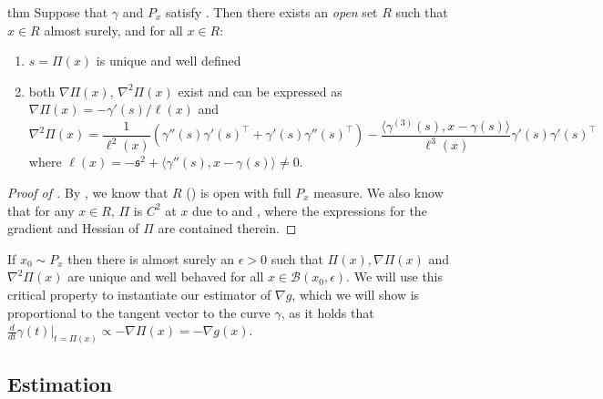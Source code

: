 \documentclass[11pt]{article}
\begin{document}
\begin{restatable}[Differentiability of $\Pi$]{thm}{} \label{thm: differentiability of pi}
    Suppose that $\gamma$ and $P_{x}$ satisfy . Then there exists an \textit{open} set $R$ such that $x \in R$ almost surely, and for all $x \in R$:
    \begin{enumerate}
        \item $s = \Pi(x)$ is unique and well defined
        \item both $\nabla\Pi(x)$, $\nabla^2\Pi(x)$ exist and can be expressed as $\nabla\Pi(x)  = -\gamma'(s)/\ell(x)$ and 
        \begin{equation}
            \nabla^2\Pi(x) = \frac{1}{\ell^2(x)}\left(\gamma''(s)\gamma'(s)^{\top} + \gamma'(s)\gamma''(s)^{\top}\right)- \frac{\langle\gamma^{(3)}(s), x - \gamma(s)\rangle}{\ell^3(x)}\gamma'(s)\gamma'(s)^{\top}
        \end{equation}
        where $\ell(x) = -\mathfrak s^2 + \langle\gamma''(s), x-\gamma(s)\rangle \neq 0$. 
    \end{enumerate}
\end{restatable}
\begin{proof}[Proof of ]
By , we know that $R$ () is open with full $P_x$ measure. We also know that for any $x \in R$, $\Pi$ is $C^2$ at $x$ due to  and , where the expressions for the gradient and Hessian of $\Pi$ are contained therein.
\end{proof}
If $x_0 \sim P_x$ then there is almost surely an $\epsilon >0$ such that $\Pi(x), \nabla\Pi(x)$ and $\nabla^2\Pi(x)$ are unique and well behaved for all $x \in \mathcal{B}(x_0, \epsilon).$ We will use this critical property to instantiate our estimator of $\nabla g$, which we will show is proportional to the tangent vector to the curve $\gamma$, as it holds that $\frac{d}{dt}\gamma(t)\Big|_{t = \Pi(x)} \propto -\nabla\Pi(x) = -\nabla g(x)$.

\subsection{Estimation}
\end{document}
